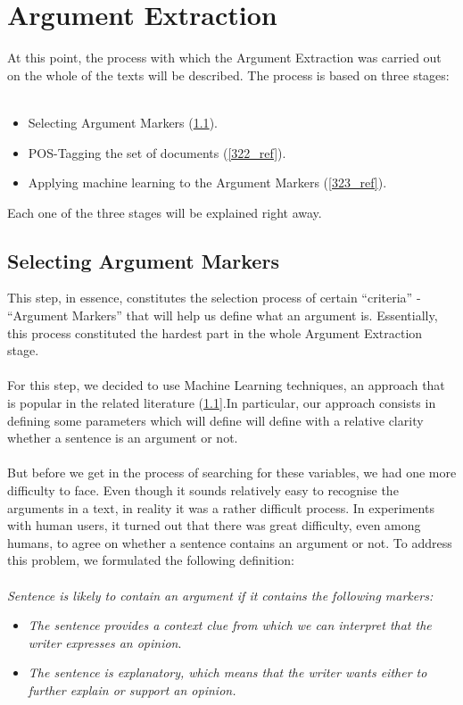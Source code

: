 \section{Argument Extraction}\label{32_ref}
At this point, the process with which the Argument Extraction was carried out on the whole of the texts will be described. The process is based on three stages:\\
\\
\begin{itemize}

	\item Selecting Argument Markers (\ref{321_ref}).
	\item POS-Tagging the set of documents (\ref{322_ref}).
	\item Applying machine learning  to the Argument Markers (\ref{323_ref}).\\

\end{itemize}
Each one of the three stages will be explained right away.

\subsection{Selecting Argument Markers}\label{321_ref}
This step, in essence, constitutes the selection process of certain ``criteria'' - ``Argument Markers'' that will help us define what an argument is. Essentially, this process constituted the hardest part in the whole Argument Extraction stage.\\
\\
For this step, we decided to use Machine Learning techniques, an approach that is popular in the related literature (\ref{321_ref}].In particular, our approach consists in defining some parameters which will define will define with a relative clarity whether a sentence is an argument or not.\\
\\
But before we get in the process of searching for these variables, we had one more difficulty to face. Even though it sounds relatively easy to recognise the arguments in a text, in reality it was a rather difficult process. In experiments with human users, it turned out that there was great difficulty, even among humans, to agree on whether a sentence contains an argument or not. To address this problem, we formulated the following definition:\\
\\
\textit{Sentence is likely to contain an argument if it contains the following markers:\\}
\begin{itemize}

	\item \textit{The sentence provides a context clue from which we can interpret that the writer expresses an opinion}.
	\item \textit{The sentence is explanatory, which means that the writer wants either to further explain or support an opinion.\\}
	
\end{itemize}

